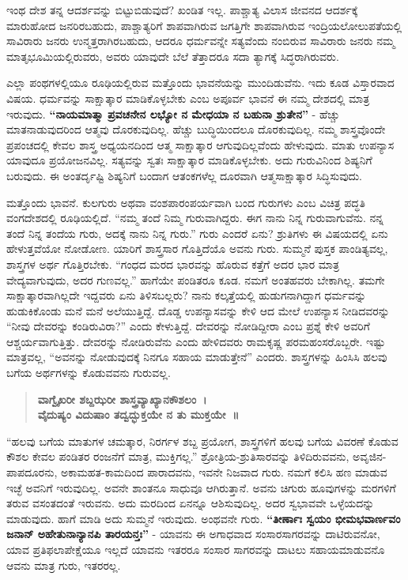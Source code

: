 ಇಂಥ ದೇಶ ತನ್ನ ಆದರ್ಶವನ್ನು ಬಿಟ್ಟುಬಿಡುವುದೆ? ಖಂಡಿತ ಇಲ್ಲ. ಪಾಶ್ಚಾತ್ಯ ವಿಲಾಸ ಜೀವನದ ಆದರ್ಶಕ್ಕೆ ಮಾರುಹೋದ ಜನರಿರಬಹುದು, ಪಾಶ್ಚಾತ್ಯರಿಗೆ ಶಾಪವಾಗಿರುವ ಜಗತ್ತಿಗೇ ಶಾಪವಾಗಿರುವ ಇಂದ್ರಿಯಲೋಲುಪತೆಯಲ್ಲಿ ಸಾವಿರಾರು ಜನರು ಉನ್ಮತ್ತರಾಗಿರಬಹುದು, ಆದರೂ ಧರ್ಮವನ್ನೇ ಸತ್ಯವೆಂದು ನಂಬಿರುವ ಸಾವಿರಾರು ಜನರು ನಮ್ಮ ಮಾತೃಭೂಮಿಯಲ್ಲಿರುವರು, ಅವರು ಯಾವುದೇ ಬೆಲೆ ತೆತ್ತಾದರೂ ಸದಾ ತ್ಯಾಗಕ್ಕೆ ಸಿದ್ಧರಾಗಿರುವರು.

ಎಲ್ಲಾ ಪಂಥಗಳಲ್ಲಿಯೂ ರೂಢಿಯಲ್ಲಿರುವ ಮತ್ತೊಂದು ಭಾವನೆಯನ್ನು ಮುಂದಿಡುವೆನು. ಇದು ಕೂಡ ವಿಸ್ತಾರವಾದ ವಿಷಯ. ಧರ್ಮವನ್ನು ಸಾಕ್ಷಾತ್ಕಾರ ಮಾಡಿಕೊಳ್ಳಬೇಕು ಎಂಬ ಅಪೂರ್ವ ಭಾವನೆ ಈ ನಮ್ಮ ದೇಶದಲ್ಲಿ ಮಾತ್ರ ಇರುವುದು. \textbf{“ನಾಯಮಾತ್ಮಾ ಪ್ರವಚನೇನ ಲಭ್ಯೋ ನ ಮೇಧಯಾ ನ ಬಹುನಾ ಶ್ರುತೇನ”} - ಹೆಚ್ಚು ಮಾತನಾಡುವುದರಿಂದ ಆತ್ಮವು ದೊರಕುವುದಿಲ್ಲ. ಹೆಚ್ಚು ಬುದ್ಧಿಯಿಂದಲೂ ದೊರಕುವುದಿಲ್ಲ. ನಮ್ಮ ಶಾಸ್ತ್ರವೊಂದೇ ಪ್ರಪಂಚದಲ್ಲಿ ಕೇವಲ ಶಾಸ್ತ್ರ ಅಧ್ಯಯನದಿಂದ ಆತ್ಮ ಸಾಕ್ಷಾತ್ಕಾರ ಆಗುವುದಿಲ್ಲವೆಂದು ಹೇಳುವುದು. ಮಾತು ಉಪನ್ಯಾಸ ಯಾವುದೂ ಪ್ರಯೋಜನವಿಲ್ಲ. ಸತ್ಯವನ್ನು ಸ್ವತಃ ಸಾಕ್ಷಾತ್ಕಾರ ಮಾಡಿಕೊಳ್ಳಬೇಕು. ಅದು ಗುರುವಿನಿಂದ ಶಿಷ್ಯನಿಗೆ ಬರುವುದು. ಈ ಅಂತರ್ದೃಷ್ಟಿ ಶಿಷ್ಯನಿಗೆ ಬಂದಾಗ ಆತಂಕಗಳೆಲ್ಲ ದೂರವಾಗಿ ಆತ್ಮಸಾಕ್ಷಾತ್ಕಾರ ಸಿದ್ಧಿಸುವುದು.

ಮತ್ತೊಂದು ಭಾವನೆ. ಕುಲಗುರು ಅಥವಾ ವಂಶಪಾರಂಪರ್ಯವಾಗಿ ಬಂದ ಗುರುಗಳು ಎಂಬ ವಿಚಿತ್ರ ಪದ್ಧತಿ ವಂಗದೇಶದಲ್ಲಿ ರೂಢಿಯಲ್ಲಿದೆ. “ನಮ್ಮ ತಂದೆ ನಿಮ್ಮ ಗುರುವಾಗಿದ್ದರು. ಈಗ ನಾನು ನಿನ್ನ ಗುರುವಾಗುವೆನು. ನನ್ನ ತಂದೆ ನಿನ್ನ ತಂದೆಯ ಗುರು, ಅದಕ್ಕೆ ನಾನು ನಿನ್ನ ಗುರು.” ಗುರು ಎಂದರೆ ಏನು? ಶ್ರುತಿಗಳು ಈ ವಿಷಯದಲ್ಲಿ ಏನು ಹೇಳುತ್ತವೆಯೋ ನೋಡೋಣ. ಯಾರಿಗೆ ಶಾಸ್ತ್ರಸಾರ ಗೊತ್ತಿದೆಯೊ ಅವನು ಗುರು. ಸುಮ್ಮನೆ ಪುಸ್ತಕ ಪಾಂಡಿತ್ಯವಲ್ಲ, ಶಾಸ್ತ್ರಗಳ ಅರ್ಥ ಗೊತ್ತಿರಬೇಕು. “ಗಂಧದ ಮರದ ಭಾರವನ್ನು ಹೊರುವ ಕತ್ತೆಗೆ ಅದರ ಭಾರ ಮಾತ್ರ ವೇದ್ಯವಾಗುವುದು, ಅದರ ಗುಣವಲ್ಲ.” ಹಾಗೆಯೇ ಪಂಡಿತರೂ ಕೂಡ. ನಮಗೆ ಅಂತಹವರು ಬೇಕಾಗಿಲ್ಲ. ತಮಗೇ ಸಾಕ್ಷಾತ್ಕಾರವಾಗಿಲ್ಲದೇ ಇದ್ದವರು ಏನು ತಿಳಿಸಬಲ್ಲರು? ನಾನು ಕಲ್ಕತ್ತೆಯಲ್ಲಿ ಹುಡುಗನಾಗಿದ್ದಾಗ ಧರ್ಮವನ್ನು ಹುಡುಕಿಕೊಂಡು ಮನೆ ಮನೆ ಅಲೆಯುತ್ತಿದ್ದೆ. ದೊಡ್ಡ ಉಪನ್ಯಾಸವನ್ನು ಕೇಳಿ ಆದ ಮೇಲೆ ಉಪನ್ಯಾಸ ನೀಡಿದವರನ್ನು “ನೀವು ದೇವರನ್ನು ಕಂಡಿರುವಿರಾ?” ಎಂದು ಕೇಳುತ್ತಿದ್ದೆ. ದೇವರನ್ನು ನೋಡಿದ್ದೀರಾ ಎಂಬ ಪ್ರಶ್ನೆ ಕೇಳಿ ಅವರಿಗೆ ಆಶ್ಚರ್ಯವಾಗುತ್ತಿತ್ತು. ದೇವರನ್ನು ನೋಡಿರುವೆನು ಎಂದು ಹೇಳಿದವರು ರಾಮಕೃಷ್ಣ ಪರಮಹಂಸರೊಬ್ಬರೇ. ಇಷ್ಟು ಮಾತ್ರವಲ್ಲ, “ಅವನನ್ನು ನೋಡುವುದಕ್ಕೆ ನಿನಗೂ ಸಹಾಯ ಮಾಡುತ್ತೇನೆ” ಎಂದರು. ಶಾಸ್ತ್ರಗಳನ್ನು ಹಿಂಸಿಸಿ ಹಲವು ಬಗೆಯ ಅರ್ಥಗಳನ್ನು ಕೊಡುವವನು ಗುರುವಲ್ಲ.

\begin{verse}
\textbf{ವಾಗ್ವೈಖರೀ ಶಬ್ದಝರೀ ಶಾಸ್ತ್ರವ್ಯಾಖ್ಯಾನಕೌಶಲಂ~।}\\\textbf{ವೈದುಷ್ಯಂ ವಿದುಷಾಂ ತದ್ವದ್ಭುಕ್ತಯೇ ನ ತು ಮುಕ್ತಯೇ~॥}
\end{verse}

“ಹಲವು ಬಗೆಯ ಮಾತುಗಳ ಚಮತ್ಕಾರ, ನಿರರ್ಗಳ ಶಬ್ದ ಪ್ರಯೋಗ, ಶಾಸ್ತ್ರಗಳಿಗೆ ಹಲವು ಬಗೆಯ ವಿವರಣೆ ಕೊಡುವ ಕೌಶಲ ಕೇವಲ ಪಂಡಿತರ ರಂಜನೆಗೆ ಮಾತ್ರ, ಮುಕ್ತಿಗಲ್ಲ.” ಶ್ರೋತ್ರಿಯ-ಶ್ರುತಿಸಾರವನ್ನು ತಿಳಿದಿರುವವನು, ಅವೃಜಿನ-ಪಾಪದೂರನು, ಅಕಾಮಹತ-ಕಾಮದಿಂದ ಪಾರಾದವನು, ಇವನೇ ನಿಜವಾದ ಗುರು. ನಮಗೆ ಕಲಿಸಿ ಹಣ ಮಾಡುವ ಇಚ್ಛೆ ಅವನಿಗೆ ಇರುವುದಿಲ್ಲ. ಅವನೇ ಶಾಂತನೂ ಸಾಧುವೂ ಆಗಿರುತ್ತಾನೆ. ಅವನು ಚಿಗುರು ಹೂವುಗಳನ್ನು ಮರಗಳಿಗೆ ತರುವ ವಸಂತದಂತೆ ಇರುವನು. ಅದು ಮರದಿಂದ ಏನನ್ನೂ ಆಶಿಸುವುದಿಲ್ಲ. ಅದರ ಸ್ವಭಾವವೇ ಒಳ್ಳೆಯದನ್ನು ಮಾಡುವುದು. ಹಾಗೆ ಮಾಡಿ ಅದು ಸುಮ್ಮನೆ ಇರುವುದು. ಅಂಥವನೇ ಗುರು. \textbf{“ತೀರ್ಣಾಃ ಸ್ವಯಂ ಭೀಮಭವಾರ್ಣವಂ ಜನಾನ್​ ಅಹೇತುನಾನ್ಯಾನಪಿ ತಾರಯನ್ತಃ”} - ಯಾವನು ಈ ಅಗಾಧವಾದ ಸಂಸಾರಸಾಗರವನ್ನು ದಾಟಿರುವನೋ, ಯಾವ ಪ್ರತಿಫಲಾಪೇಕ್ಷೆಯೂ ಇಲ್ಲದೆ ಯಾವನು ಇತರರೂ ಸಂಸಾರ ಸಾಗರವನ್ನು ದಾಟಲು ಸಹಾಯಮಾಡುವನೊ ಆವನು ಮಾತ್ರ ಗುರು, ಇತರರಲ್ಲ.

